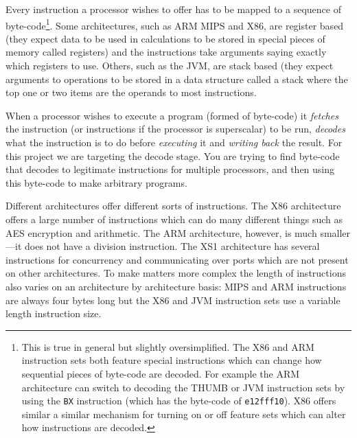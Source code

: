 \documentclass[10pt,]{book}
\begin{document}
Every instruction a processor wishes to offer has to be mapped to a
sequence of byte-code\footnote{This is true in general but slightly
  oversimplified. The X86 and ARM instruction sets both feature special
  instructions which can change how sequential pieces of byte-code are
  decoded. For example the ARM architecture\autocite{Seal:2000vd} can
  switch to decoding the THUMB or JVM instruction sets by using the
  \lstinline!BX! instruction (which has the byte-code of
  \lstinline!e12fff10!). X86\autocite{IntelCorporation:1997ta} offers
  similar a similar mechanism for turning on or off feature sets which
  can alter how instructions are decoded.}. Some architectures, such as
ARM\autocite{Seal:2000vd} MIPS\autocite{MIPSTechnologiesInc:2011ta} and
X86\autocite{IntelCorporation:1997ta}, are register based (they expect
data to be used in calculations to be stored in special pieces of memory
called registers) and the instructions take arguments saying exactly
which registers to use. Others, such as the
JVM\autocite{Lindholm:2012wy}, are stack based (they expect arguments to
operations to be stored in a data structure called a stack where the top
one or two items are the operands to most instructions.

When a processor wishes to execute a program (formed of byte-code) it
\emph{fetches} the instruction (or instructions if the processor is
superscalar) to be run, \emph{decodes} what the instruction is to do
before \emph{executing} it and \emph{writing back} the result. For this
project we are targeting the decode stage. You are trying to find
byte-code that decodes to legitimate instructions for multiple
processors, and then using this byte-code to make arbitrary programs.

Different architectures offer different sorts of instructions. The X86
architecture offers a large number of instructions which can do many
different things such as AES encryption and arithmetic\autocite{refx86}.
The ARM architecture\autocite{Seal:2000vd}, however, is much
smaller---it does not have a division instruction. The XS1
architecture\autocite{May:ua} has several instructions for concurrency
and communicating over ports which are not present on other
architectures. To make matters more complex the length of instructions
also varies on an architecture by architecture basis: MIPS and ARM
instructions are always four bytes long but the X86 and JVM instruction
sets use a variable length instruction size.
\end{document}
